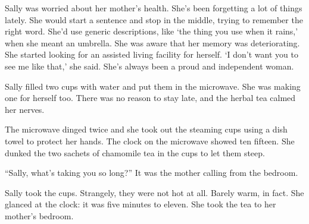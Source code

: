 \documentclass{memoir}
\begin{document}
Sally was worried about her mother's health. She's been forgetting a lot of things lately. She would start a sentence and stop in the middle, trying to remember the right word. She'd use generic descriptions, like `the thing you use when it rains,' when she meant an umbrella. She was aware that her memory was deteriorating. She started looking for an assisted living facility for herself. `I don't want you to see me like that,' she said. She's always been a proud and independent woman. 

Sally filled two cups with water and put them in the microwave. She was making one for herself too. There was no reason to stay late, and the herbal tea calmed her nerves.

The microwave dinged twice and she took out the steaming cups using a dish towel to protect her hands. The clock on the microwave showed ten fifteen. She dunked the two sachets of chamomile tea in the cups to let them steep.

``Sally, what's taking you so long?'' It was the mother calling from the bedroom. 

Sally took the cups. Strangely, they were not hot at all. Barely warm, in fact. She glanced at the clock: it was five minutes to eleven. She took the tea to her mother's bedroom.
\end{document}
